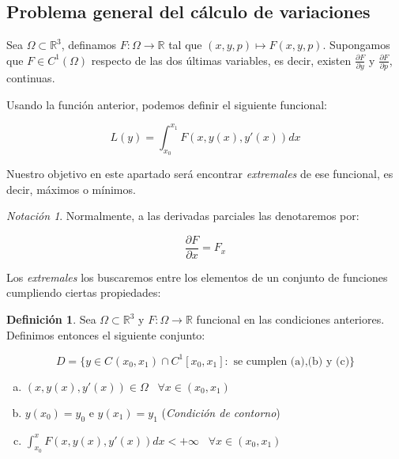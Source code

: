 \documentclass[12pt]{article}
\newcommand{\R}{\mathbb{R}}
\theoremstyle{definition}
\newtheorem{definition}[theorem]{Definición}
\theoremstyle{remark}
\newtheorem{notacion}[theorem]{Notación}
\newcommand{\continuas}[1][]{C^{ #1 }[x_0,x_1]}
\newcommand{\continuasabierto}[1][]{C^{ #1 }(x_0,x_1)}
\newcommand{\derivada}[2]{\frac{\partial #1 }{\partial #2 }}
\newcommand{\xcero}{(x_0,x_1)}
\newcommand{\fvariaciones}{F(x,y(x),y'(x))}
\newcommand{\espacio}{\;\;\;}
\begin{document}
\subsection{Problema general del cálculo de variaciones}

Sea $\Omega\subset\R^3$, definamos $F:\Omega \longrightarrow \R$ tal que $(x,y,p)\longmapsto F(x,y,p)$. Supongamos que $F\in C^1(\Omega)$  respecto de las dos últimas variables, es decir, existen $\derivada{F}{y}$ y $\derivada{F}{p}$, continuas. 

Usando la función anterior, podemos definir el siguiente funcional:

\begin{equation}\label{funcional}
L(y) = \int_{x_0}^{x_1}\fvariaciones dx 
\end{equation}


Nuestro objetivo en este apartado será encontrar \textit{extremales} de ese funcional, es decir, máximos o mínimos.

\begin{notacion}
Normalmente, a las derivadas parciales las denotaremos por:

\[
\derivada{F}{x}=F_x
\]

\end{notacion} 

Los \textit{extremales} los buscaremos entre los elementos de un conjunto de funciones cumpliendo ciertas propiedades:

\begin{definition} 

Sea $\Omega\subset\R^3$ y $F:\Omega\longrightarrow \R$ funcional en las condiciones anteriores. Definimos entonces el siguiente conjunto:

\begin{equation}\label{espaciofunciones}
D=\{y\in\continuasabierto\cap\continuas[1]: \text{ se cumplen (a),(b) y (c)}\}
\end{equation}

\begin{enumerate}[(a)]

\item $(x,y(x),y'(x))\in\Omega \espacio \forall x\in\xcero$
\item $y(x_0)=y_0$ e $y(x_1)=y_1$ (\textit{Condición de contorno})
\item $\displaystyle\int_{x_0}^x\fvariaciones dx<+\infty \espacio \forall x\in \xcero$ 
\end{enumerate}

\end{definition}
\end{document}

